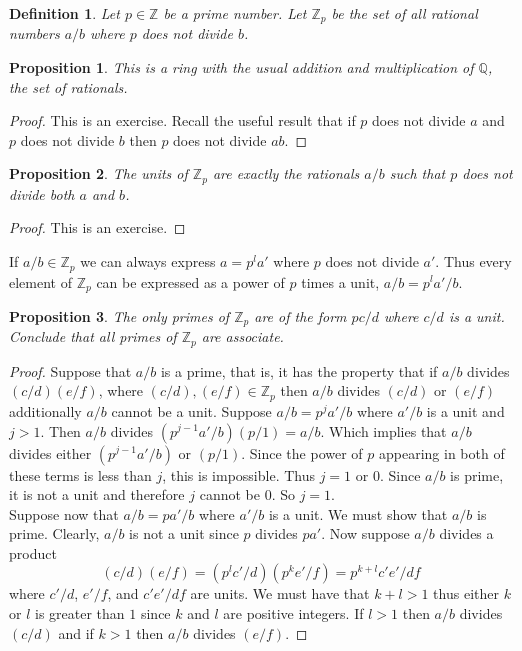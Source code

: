 \documentclass{article}
\theoremstyle{problemstyle}
\newtheorem{proposition}{Proposition}
\newtheorem{definition}{Definition}
\begin{document}
\begin{definition}
Let $p \in \mathbb{Z}$ be a prime number. Let $\mathbb{Z}_p$ be the set of all rational numbers $a/b$ where $p$ does not divide $b$.  
\end{definition}

\begin{proposition}
This is a ring with the usual addition and multiplication of $\mathbb{Q}$, the set of rationals. 
\end{proposition}

\begin{proof}
This is an exercise. Recall the useful result that if $p$ does not divide $a$ and $p$ does not divide $b$ then $p$ does not divide $ab$. 
\end{proof}

\begin{proposition}
The units of $\mathbb{Z}_p$ are exactly the rationals $a/b$ such that $p$ does not divide both $a$ and $b$. 
\end{proposition}

\begin{proof}
This is an exercise. 
\end{proof}

If $a/b \in \mathbb{Z}_p$ we can always express $a = p^la'$ where $p$ does not divide $a'$. Thus every element of $\mathbb{Z}_p$ can be expressed as a power of $p$ times a unit, $a/b = p^la'/b$. 

\begin{proposition}
The only primes of $\mathbb{Z}_p$ are of the form $pc/d$ where $c/d$ is a unit. Conclude that all primes of $\mathbb{Z}_p$ are associate. 
\end{proposition}

\begin{proof}
Suppose that $a/b$ is a prime, that is, it has the property that if $a/b$ divides $(c/d)(e/f)$, where $(c/d),(e/f) \in \mathbb{Z}_p$ then $a/b$ divides $(c/d)$ or $(e/f)$ additionally $a/b$ cannot be a unit. Suppose $a/b = p^ja'/b$ where $a'/b$ is a unit and $j >1$. Then $a/b$ divides $(p^{j-1}a'/b)(p/1) = a/b$. Which implies that $a/b$ divides either $(p^{j-1}a'/b)$ or $(p/1)$. Since the power of $p$ appearing in both of these terms is less than $j$, this is impossible. Thus $j = 1$ or $0$. Since $a/b$ is prime, it is not a unit and therefore $j$ cannot be $0$. So $j = 1$.\\  

Suppose now that $a/b = pa'/b$ where $a'/b$ is a unit. We must show that $a/b$ is prime. Clearly, $a/b$ is not a unit since $p$ divides $pa'$. Now suppose $a/b$ divides a product $$(c/d)(e/f) = (p^lc'/d)(p^ke'/f) = p^{k+l}c'e'/df$$ where $c'/d$, $e'/f$, and $c'e'/df$ are units. We must have that $k+l>1$ thus either $k$ or $l$ is greater than $1$ since $k$ and $l$ are positive integers. If $l>1$ then $a/b$ divides $(c/d)$ and if $k>1$ then $a/b$ divides $(e/f)$. 
\end{proof}
\end{document}
